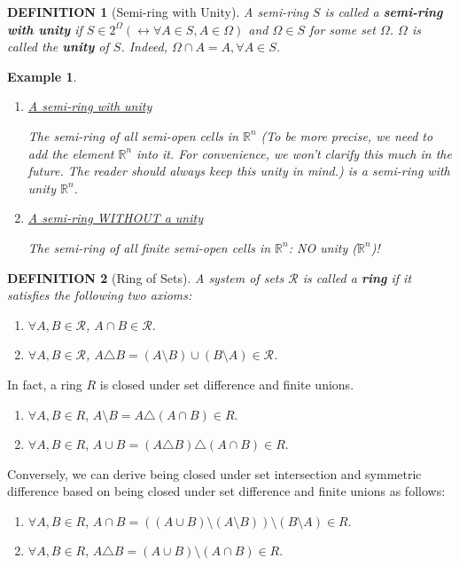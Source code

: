 \documentclass[12pt]{article}
\theoremstyle{blueplain}
\theoremstyle{bluedef}
\newtheorem{definition}{DEFINITION}[section]
\theoremstyle{blueremark}
\newtheorem{example}{Example}[section]
\newcommand{\R}{\mathbb{R}}
\numberwithin{equation}{section}
\begin{document}
\begin{definition}[Semi-ring with Unity]

  A semi-ring $S$ is called a \textbf{semi-ring with unity} if $S \in 2^\Omega (\leftrightarrow \forall A \in S, A \in \Omega) $ and $\Omega \in S$ for some set $\Omega$. $\Omega$ is called the \textbf{unity} of $S$. Indeed, $\Omega \cap A = A, \forall A \in S$.
\end{definition}

\begin{example}
  \begin{enumerate}
    \item \underline{A semi-ring with unity}

          The semi-ring of all semi-open cells in $\R^n$ (To be more precise, we need to add the element $\R^n$ into it. For convenience, we won't clarify this much in the future. The reader should always keep this unity in mind.) is a semi-ring with unity $\R^n$.
    \item \underline{A semi-ring WITHOUT a unity}

          The semi-ring of all finite semi-open cells in $\R^n$: NO unity ($\R^n$)!
  \end{enumerate}
\end{example}

\begin{definition}[Ring of Sets]

  A system of sets $\mathcal{R}$ is called a \textbf{ring} if it satisfies the following two axioms:
  \begin{enumerate}
    \item $\forall A, B \in \mathcal{R}$, $A \cap B \in \mathcal{R}$.
    \item $\forall A, B \in \mathcal{R}$, $A \triangle B = (A \setminus B) \cup (B \setminus A) \in \mathcal{R}$.
  \end{enumerate}
\end{definition}

In fact, a ring $R$ is closed under set difference and finite unions.
\begin{enumerate}
  \item $\forall A, B \in R$, $A \setminus B = A \triangle (A \cap B) \in R$.
  \item $\forall A, B \in R$, $A \cup B = (A \triangle B) \triangle (A \cap B) \in R$.
\end{enumerate}

Conversely, we can derive being closed under set intersection and symmetric difference based on being closed under set difference and finite unions as follows:
\begin{enumerate}
  \item $\forall A, B \in R$, $A \cap B =  ((A \cup B) \setminus (A \setminus B)) \setminus (B \setminus A)\in R$.
  \item $\forall A, B \in R$, $A \triangle B = (A \cup B) \setminus (A \cap B) \in R$.
\end{enumerate}
\end{document}
